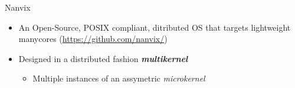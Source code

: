 \documentclass[english,aspectratio=169]{lapesd-slides}
\begin{document}

  \stopcountingframes


  \thanksframe

  \begin{backup}

    \begin{frame}{Nanvix}
      \begin{itemize}
        \item An Open-Source, POSIX compliant, ditributed OS that targets lightweight
          manycores (\url{https://github.com/nanvix/})
        \item Designed in a distributed fashion \textbf{\textit{multikernel}}
        \begin{itemize}
          \item Multiple instances of an assymetric \textit{microkernel}
        \end{itemize}
      \end{itemize}

    \end{frame}

  \end{backup}
\end{document}

